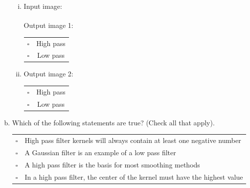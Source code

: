\begin{enumerate}[(a)]
\begin{enumerate}[(i)]
\item
Input image:\\
 \\
Output image 1:\\
\begin{tabular}[h]{lc}
$\square$ & High pass \\
$\square$ & Low pass \\
\end{tabular}

\item
Output image 2:\\
\begin{tabular}[h]{lc}
$\square$ & High pass \\
$\square$ & Low pass \\
\end{tabular}
\end{enumerate}

\item
Which of the following statements are true? (Check all that apply).

\begin{tabular}[h]{ll}
$\square$ & High pass filter kernels will always contain at least one negative number \\
$\square$ & A Gaussian filter is an example of a low pass filter \\
$\square$ & A high pass filter is the basis for most smoothing methods \\
$\square$ & In a high pass filter, the center of the kernel must have the highest value \\
\end{tabular}

\end{enumerate}



